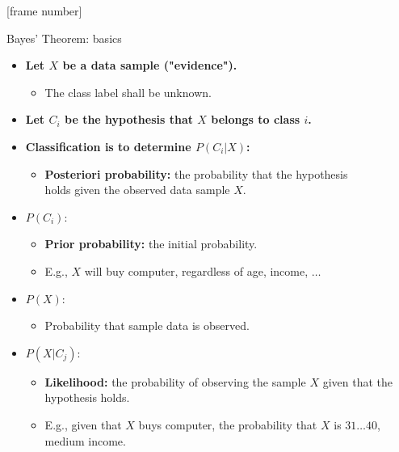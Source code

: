 \documentclass[aspectratio=169,t,table]{beamer}
\begin{document}
  {
    [frame number]
    \begin{frame}{Bayes' Theorem: basics}
        \begin{itemize}
          \item \textbf{Let $X$ be a data sample ("evidence").}
          \begin{itemize}
            \item The class label shall be unknown.
          \end{itemize}
          \item \textbf{Let $C_i$ be the hypothesis that $X$ belongs to class $i$.}
          \item \textbf{Classification is to determine $P(C_i|X)$:}
          \begin{itemize}
            \item \textbf{\color{airforceblue}Posteriori probability:} the probability that the hypothesis \\ holds given the observed data sample $X$.
          \end{itemize}
          \item $P(C_i)$:
          \begin{itemize}
            \item \textbf{\color{airforceblue}Prior probability:} the initial probability.
            \item E.g., $X$ will buy computer, regardless of age, income, $\ldots$
          \end{itemize}
          \item $P(X)$:
          \begin{itemize}
            \item Probability that sample data is observed.
          \end{itemize}
          \item $P(X|C_j)$:
          \begin{itemize}
            \item \textbf{\color{airforceblue}Likelihood:} the probability of observing the sample $X$ given that the hypothesis holds.
            \item E.g., given that $X$ buys computer, the probability that $X$ is $31\ldots40$, medium income.
          \end{itemize}
        \end{itemize}
    \end{frame}
  }
\end{document}
